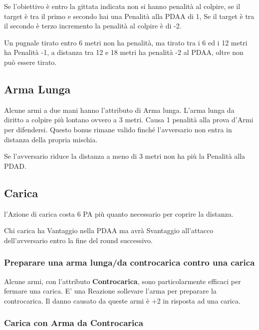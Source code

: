 \documentclass[12pt,a4paper,twoside,openany]{book}
\begin{document}
\begin{multicols}{2}
Se l'obiettivo è entro la gittata indicata non si hanno penalità al colpire, se il target è tra il primo e secondo hai una Penalità alla PDAA di 1, Se il target è tra il secondo è terzo incremento la penalità al colpire è di -2.

Un pugnale tirato entro 6 metri non ha penalità, ma tirato tra i 6 ed i 12 metri ha Penalità -1, a distanza tra 12 e 18 metri ha penalità -2 al PDAA, oltre non può essere tirato.

\subsection{Arma Lunga} \label{armalunga}

Alcune armi a due mani hanno l'attributo di Arma lunga. L'arma lunga da diritto a colpire più lontano ovvero a 3 metri. Causa 1 penalità alla prova d'Armi per difendersi. Questo bonus rimane valido finché l'avversario non entra in distanza della propria mischia.

Se l'avversario riduce la distanza a meno di 3 metri non ha più la Penalità alla PDAD.

\subsection{Carica} \label{carica}

l'Azione di carica costa 6 PA più quanto necessario per coprire la distanza.

Chi carica ha Vantaggio nella PDAA ma avrà Svantaggio all'attacco dell'avversario entro la fine del round successivo.

\subsubsection{Preparare una arma lunga/da controcarica contro una carica} \label{prepararearmalungacontrocarica}

Alcune armi, con l'attributo \textbf{Controcarica}, sono particolarmente efficaci per fermare una carica. E' una Reazione sollevare l'arma per preparare la controcarica. Il danno causato da queste armi è +2 in risposta ad una carica.

\subsubsection{Carica con Arma da Controcarica} \label{caricaarmadacontrocarica}


\end{multicols}
\end{document}
